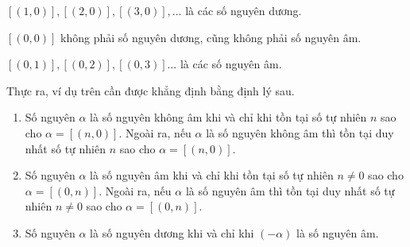 \begin{example}
	$[(1, 0)], [(2, 0)], [(3, 0)], \ldots$ là các số nguyên dương.

	$[(0,0)]$ không phải số nguyên dương, cũng không phải số nguyên âm.

	$[(0, 1)], [(0, 2)], [(0, 3)] \ldots$ là các số nguyên âm.
\end{example}

\noindent Thực ra, ví dụ trên cần được khẳng định bằng định lý sau.

\begin{theorem}\label{theorem:positive-negative-nonnegative-integers}
	\begin{enumerate}[label={(\roman*)}]
		\item Số nguyên $\alpha$ là số nguyên không âm khi và chỉ khi tồn tại số tự nhiên $n$ sao cho $\alpha = [(n, 0)]$. Ngoài ra, nếu $\alpha$ là số nguyên không âm thì tồn tại duy nhất số tự nhiên $n$ sao cho $\alpha = [(n, 0)]$.
		\item Số nguyên $\alpha$ là số nguyên âm khi và chỉ khi tồn tại số tự nhiên $n\ne 0$ sao cho $\alpha = [(0, n)]$. Ngoài ra, nếu $\alpha$ là số nguyên âm thì tồn tại duy nhất số tự nhiên $n\ne 0$ sao cho $\alpha = [(0, n)]$.
		\item Số nguyên $\alpha$ là số nguyên dương khi và chỉ khi $(-\alpha)$ là số nguyên âm.
	\end{enumerate}
\end{theorem}

